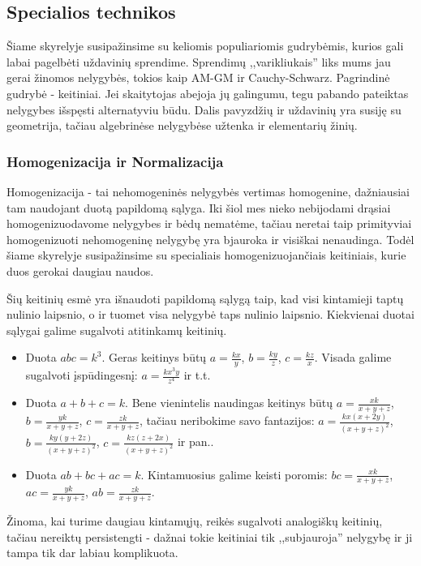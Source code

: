 \newpage
\subsection{Specialios technikos}

Šiame skyrelyje susipažinsime su keliomis populiariomis gudrybėmis, kurios
gali labai pagelbėti uždavinių sprendime. Sprendimų
,,varikliukais'' liks mums jau gerai žinomos nelygybės, tokios kaip AM-GM
ir Cauchy-Schwarz. Pagrindinė gudrybė - keitiniai. Jei skaitytojas abejoja
jų galingumu, tegu pabando pateiktas nelygybes išspęsti alternatyviu būdu.
Dalis pavyzdžių ir uždavinių yra susiję su geometrija, tačiau algebrinėse
nelygybėse užtenka ir elementarių žinių.

\subsubsection{Homogenizacija ir Normalizacija}

Homogenizacija - tai nehomogeninės nelygybės vertimas homogenine,
dažniausiai tam naudojant duotą papildomą sąlyga. Iki šiol mes nieko
nebijodami drąsiai homogenizuodavome nelygybes ir bėdų nematėme, tačiau
neretai taip primityviai homogenizuoti nehomogeninę nelygybę yra bjauroka
ir visiškai nenaudinga. Todėl šiame skyrelyje susipažinsime su specialiais
homogenizuojančiais keitiniais, kurie duos gerokai daugiau naudos.

Šių keitinių esmė yra išnaudoti papildomą sąlygą taip, kad visi kintamieji
taptų nulinio laipsnio, o ir tuomet visa nelygybė taps nulinio laipsnio.
Kiekvienai duotai sąlygai galime sugalvoti atitinkamų keitinių.
\begin{itemize}
  \item Duota $abc=k^3$. Geras keitinys būtų $a=\frac{kx}{y}$,
    $b=\frac{ky}{z}$, $c=\frac{kz}{x}$. Visada galime sugalvoti
    įspūdingesnį: $a=\frac{kx^3y}{z^4}$ ir t.t.
  \item Duota $a+b+c=k$. Bene vienintelis naudingas keitinys būtų
    $a=\frac{xk}{x+y+z}$, $b=\frac{yk}{x+y+z}$, $c=\frac{zk}{x+y+z}$,
    tačiau neribokime savo fantazijos: $a=\frac{kx(x+2y)}{(x+y+z)^2}$,
    $b=\frac{ky(y+2z)}{(x+y+z)^2}$, $c=\frac{kz(z+2x)}{(x+y+z)^2}$ ir pan..
  \item Duota $ab+bc+ac=k$. Kintamuosius galime keisti poromis:
    $bc=\frac{xk}{x+y+z}$, $ac=\frac{yk}{x+y+z}$, $ab=\frac{zk}{x+y+z}$.
\end{itemize}

Žinoma, kai turime daugiau kintamųjų, reikės sugalvoti analogiškų keitinių,
tačiau nereiktų persistengti - dažnai tokie keitiniai tik ,,subjauroja''
nelygybę ir ji tampa tik dar labiau komplikuota.

